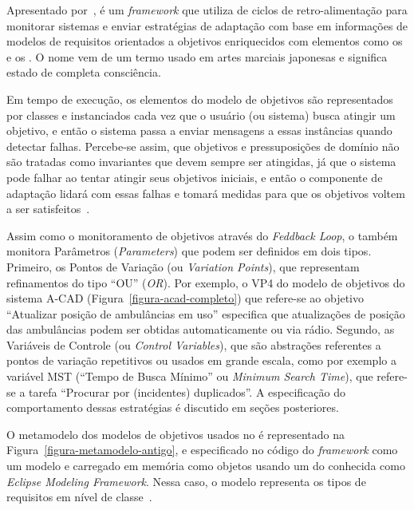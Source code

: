 Apresentado por~\cite{tesevitor}, \zanshin é um \textit{framework} que utiliza de ciclos de retro-alimentação para monitorar sistemas e enviar estratégias de adaptação com base em informações de modelos de requisitos orientados a objetivos enriquecidos com elementos como os \awreqs e os \evoreqs. O nome \zanshin vem de um termo usado em artes marciais japonesas e significa estado de completa consciência.

Em tempo de execução, os elementos do modelo de objetivos são representados por classes e instanciados cada vez que o usuário (ou sistema) busca atingir um objetivo, e então o sistema passa a enviar mensagens a essas instâncias quando detectar falhas. Percebe-se assim, que objetivos e pressuposições de domínio não são tratadas como invariantes que devem sempre ser atingidas, já que o sistema pode falhar ao tentar atingir seus objetivos iniciais, e então o componente de adaptação lidará com essas falhas e tomará medidas para que os objetivos voltem a ser satisfeitos~\cite{souza2013requirements}.

Assim como o monitoramento de objetivos através do \textit{Feddback Loop}, o \zanshin também monitora Parâmetros (\textit{Parameters}) que podem ser definidos em dois tipos. Primeiro, os Pontos de Variação (ou \textit{Variation Points}), que representam refinamentos do tipo ``OU'' (\textit{OR}). Por exemplo, o VP4 do modelo de objetivos do sistema A-CAD (Figura~\ref{figura-acad-completo}) que refere-se ao objetivo ``Atualizar posição de ambulâncias em uso'' especifica que atualizações de posição das ambulâncias podem ser obtidas automaticamente ou via rádio. Segundo, as Variáveis de Controle (ou \textit{Control Variables}), que são abstrações referentes a pontos de variação repetitivos ou usados em grande escala, como por exemplo a variável MST (``Tempo de Busca Mínimo'' ou \textit{Minimum Search Time}), que refere-se a tarefa ``Procurar por (incidentes) duplicados''. A especificação do comportamento dessas estratégias é discutido em seções posteriores.

O metamodelo dos modelos de objetivos usados no \zanshin é representado na Figura~\ref{figura-metamodelo-antigo}, e especificado no código do \textit{framework} como um modelo \ecore e carregado em memória como objetos \java usando um \framework do \eclipse conhecida como \textit{Eclipse Modeling Framework}. Nessa caso, o modelo \ecore representa os tipos de requisitos em nível de classe~\cite{souza2013requirements}. 

